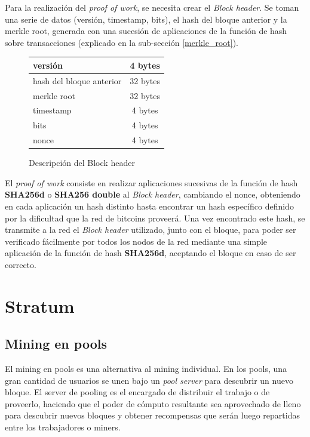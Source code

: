 \documentclass[a4paper, 10pt, twoside]{article}
\begin{document}
Para la realización del \textit{proof of work}, se necesita crear el \textit{Block header}. Se toman una serie de datos (versión, timestamp, bits), el hash del bloque anterior y la merkle root, generada con una sucesión de aplicaciones de la función de hash sobre transacciones (explicado en la sub-sección \ref{merkle_root}).

\begin{figure}[H]
  \centering
  \begin{tabular}{ | l | c | }
    \hline
    versión & 4 bytes \\ \hline
    hash del bloque anterior & 32 bytes \\ \hline
    merkle root & 32 bytes \\ \hline
    timestamp & 4 bytes \\ \hline
    bits & 4 bytes \\ \hline
    nonce & 4 bytes \\ \hline
  \end{tabular}
  \caption{Descripción del Block header}
\end{figure}

El \textit{proof of work} consiste en realizar aplicaciones sucesivas de la función de hash \textbf{SHA256d} o \textbf{SHA256 double} al \textit{Block header}, cambiando el nonce, obteniendo en cada aplicación un hash distinto hasta encontrar un hash específico definido por la dificultad que la red de bitcoins proveerá. Una vez encontrado este hash, se transmite a la red el \textit{Block header} utilizado, junto con el bloque, para poder ser verificado fácilmente por todos los nodos de la red mediante una simple aplicación de la función de hash \textbf{SHA256d}, aceptando el bloque en caso de ser correcto.


\section{Stratum}

\subsection{Mining en pools}
El mining en pools es una alternativa al mining individual. En los pools, una gran cantidad de usuarios se unen bajo un \textit{pool server} para descubrir un nuevo bloque. El server de pooling es el encargado de distribuir el trabajo o de proveerlo, haciendo que el poder de cómputo resultante sea aprovechado de lleno para descubrir nuevos bloques y obtener recompensas que serán luego repartidas entre los trabajadores o miners.
\end{document}
